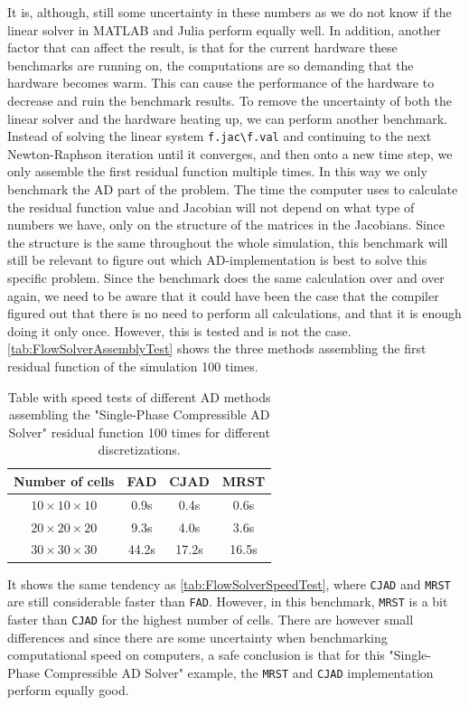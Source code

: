 It is, although, still some uncertainty in these numbers as we do not know if the linear solver in MATLAB and Julia perform equally well. In addition, another factor that can affect the result, is that for the current hardware these benchmarks are running on, the computations are so demanding that the hardware becomes warm. This can cause the performance of the hardware to decrease and ruin the benchmark results. To remove the uncertainty of both the linear solver and the hardware heating up, we can perform another benchmark. Instead of solving the linear system \texttt{f.jac\textbackslash f.val} and continuing to the next Newton-Raphson iteration until it converges, and then onto a new time step, we only assemble the first residual function multiple times. In this way we only benchmark the AD part of the problem. The time the computer uses to calculate the residual function value and Jacobian will not depend on what type of numbers we have, only on the structure of the matrices in the Jacobians. Since the structure is the same throughout the whole simulation, this benchmark will still be relevant to figure out which AD-implementation is best to solve this specific problem. Since the benchmark does the same calculation over and over again, we need to be aware that it could have been the case that the compiler figured out that there is no need to perform all calculations, and that it is enough doing it only once. However, this is tested and is not the case. \autoref{tab:FlowSolverAssemblyTest} shows the three methods assembling the first residual function of the simulation 100 times.
\begin{table}[b]
    \centering
    \caption{Table with speed tests of different AD methods assembling the "Single-Phase Compressible AD Solver" residual function 100 times for different discretizations.}
    \label{tab:FlowSolverAssemblyTest}
    \def\arraystretch{1.5}
    \begin{tabular}{cccc}
    \textbf{Number of cells} & \textbf{FAD} & \textbf{CJAD} & \textbf{MRST}\\
        \hline
         $10\times10\times10$ & 0.9s & 0.4s & 0.6s  \\  
         $20\times20\times20$ & 9.3s & 4.0s & 3.6s \\ 
         $30\times30\times30$ & 44.2s& 17.2s& 16.5s \\ \hline
    \end{tabular}
\end{table}
It shows the same tendency as \autoref{tab:FlowSolverSpeedTest}, where \texttt{CJAD} and \texttt{MRST} are still considerable faster than \texttt{FAD}. However, in this benchmark, \texttt{MRST} is a bit faster than \texttt{CJAD} for the highest number of cells. There are however small differences and since there are some uncertainty when benchmarking computational speed on computers, a safe conclusion is that for this "Single-Phase Compressible AD Solver" example, the \texttt{MRST} and \texttt{CJAD} implementation perform equally good.
